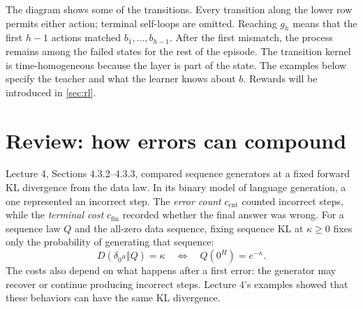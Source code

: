 \documentclass[11pt,twoside]{article}
\newcommand{\KL}{D}
\theoremstyle{definition}
\theoremstyle{remark}
\begin{document}
\begin{center}
\end{center}
The diagram shows some of the transitions. Every transition along the lower
row permits either action; terminal self-loops are omitted.
Reaching $g_h$ means that the first $h-1$ actions matched
$b_1,\ldots,b_{h-1}$. After the first mismatch, the process remains among
the failed states for the rest of the episode. The transition kernel is
time-homogeneous because the layer is part of the state.
The examples below specify the teacher and what the learner knows about
$b$. Rewards will be introduced in \cref{sec:rl}.

\section{Review: how errors can compound}
\label{sec:compounding}

Lecture 4, Sections 4.3.2--4.3.3, compared sequence generators at a fixed
forward KL divergence from the data law. In its binary model of language
generation, a one represented an incorrect step. The \emph{error count}
$c_{\mathrm{cnt}}$ counted incorrect steps, while the \emph{terminal cost}
$c_{\mathrm{fin}}$ recorded whether the final answer was wrong.
For a sequence law $Q$ and the all-zero data sequence, fixing sequence KL
at $\kappa\ge0$ fixes only the probability of generating that sequence:
\[
 \KL(\delta_{0^H}\Vert Q)=\kappa
 \quad\Longleftrightarrow\quad Q(0^H)=e^{-\kappa}.
\]
The costs also depend on what happens after a first error: the generator
may recover or continue producing incorrect steps. Lecture 4's examples
showed that these behaviors can have the same KL divergence.
\end{document}
